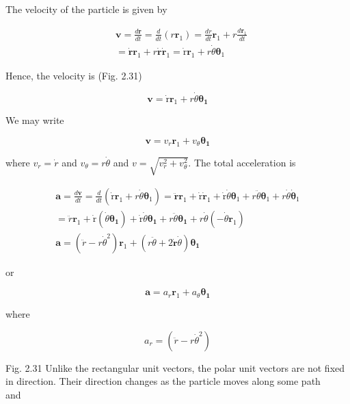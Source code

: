 \documentclass[10pt]{article}
\begin{document}
The velocity of the particle is given by

$$
\begin{aligned}
& \mathbf{v}=\frac{d \mathbf{r}}{d t}=\frac{d}{d t}\left(r \mathbf{r}_{1}\right)=\frac{d r}{d t} \mathbf{r}_{1}+r \frac{d \mathbf{r}_{1}}{d t} \\
& =\dot{\mathbf{r}} \mathbf{r}_{1}+r \dot{\mathbf{r}} \dot{\mathbf{r}}_{1}=\dot{\mathrm{r}} \mathbf{r}_{1}+r \dot{\theta} \boldsymbol{\theta}_{1}
\end{aligned}
$$

Hence, the velocity is (Fig. 2.31)


\begin{equation*}
\mathbf{v}=\dot{\mathrm{r}} \mathbf{r}_{1}+r \dot{\theta} \boldsymbol{\theta}_{\mathbf{1}} \tag{2.21}
\end{equation*}


We may write

$$
\mathbf{v}=v_{r} \mathbf{r}_{1}+v_{\theta} \boldsymbol{\theta}_{\mathbf{1}}
$$

where $v_{r}=\dot{r}$ and $v_{\theta}=r \dot{\theta}$ and $v=\sqrt{v_{r}^{2}+v_{\theta}^{2}}$. The total acceleration is


\begin{gather*}
\mathbf{a}=\frac{d \mathbf{v}}{d t}=\frac{d}{d t}\left(\dot{\mathrm{r}} \mathbf{r}_{1}+r \dot{\theta} \boldsymbol{\theta}_{1}\right)=\ddot{\boldsymbol{r}} \mathbf{r}_{1}+\dot{\mathrm{r}} \dot{\mathbf{r}}_{1}+\dot{\mathrm{r}} \dot{\theta} \boldsymbol{\theta}_{1}+r \ddot{\theta} \boldsymbol{\theta}_{1}+r \dot{\theta} \dot{\boldsymbol{\theta}}_{1} \\
=\ddot{r} \mathbf{r}_{1}+\dot{\mathrm{r}}\left(\dot{\theta} \boldsymbol{\theta}_{\mathbf{1}}\right)+\dot{\mathrm{r}} \dot{\theta} \boldsymbol{\theta}_{\mathbf{1}}+r \ddot{\theta} \boldsymbol{\theta}_{\mathbf{1}}+r \dot{\theta}\left(-\dot{\theta} \mathbf{r}_{1}\right) \\
\mathbf{a}=\left(\ddot{r}-r \dot{\theta}^{2}\right) \mathbf{r}_{1}+(r \ddot{\theta}+2 \dot{\mathbf{r}} \dot{\theta}) \boldsymbol{\theta}_{\mathbf{1}} \tag{2.22}
\end{gather*}


or

$$
\mathbf{a}=a_{r} \mathbf{r}_{1}+a_{\theta} \boldsymbol{\theta}_{\mathbf{1}}
$$

where

$$
a_{r}=\left(\ddot{r}-r \dot{\theta}^{2}\right)
$$

Fig. 2.31 Unlike the rectangular unit vectors, the polar unit vectors are not fixed in direction. Their direction changes as the particle moves along some path\\
and
\end{document}
